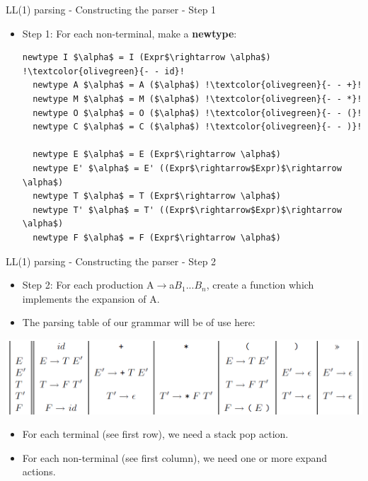 \documentclass[10pt]{beamer}
\begin{document}
\begin{frame}[fragile]{LL(1) parsing - Constructing the parser - Step 1}

\begin{itemize}
\item Step 1: For each non-terminal, make a \textbf{newtype}:
\begin{lstlisting}[mathescape=true, escapechar=!]
  newtype I $\alpha$ = I (Expr$\rightarrow \alpha$) !\textcolor{olivegreen}{- - id}!
  newtype A $\alpha$ = A ($\alpha$) !\textcolor{olivegreen}{- - +}!
  newtype M $\alpha$ = M ($\alpha$) !\textcolor{olivegreen}{- - *}!
  newtype O $\alpha$ = O ($\alpha$) !\textcolor{olivegreen}{- - (}!
  newtype C $\alpha$ = C ($\alpha$) !\textcolor{olivegreen}{- - )}!
  
  newtype E $\alpha$ = E (Expr$\rightarrow \alpha$)
  newtype E' $\alpha$ = E' ((Expr$\rightarrow$Expr)$\rightarrow \alpha$)
  newtype T $\alpha$ = T (Expr$\rightarrow \alpha$)
  newtype T' $\alpha$ = T' ((Expr$\rightarrow$Expr)$\rightarrow \alpha$)
  newtype F $\alpha$ = F (Expr$\rightarrow \alpha$)
\end{lstlisting}
\end{itemize}

\end{frame}

\begin{frame}[fragile]{LL(1) parsing - Constructing the parser - Step 2}

\begin{itemize}
\item Step 2: For each production A$\rightarrow$a$B_1...B_n$, create a function which implements the expansion of A.
\item The parsing table of our grammar will be of use here:
\end{itemize}

\includegraphics[scale=0.4]{parsing-table.png}

\begin{itemize}
\item For each terminal (see first row), we need a stack pop action.
\item For each non-terminal (see first column), we need one or more expand actions.
\end{itemize}

\end{frame}
\end{document}
